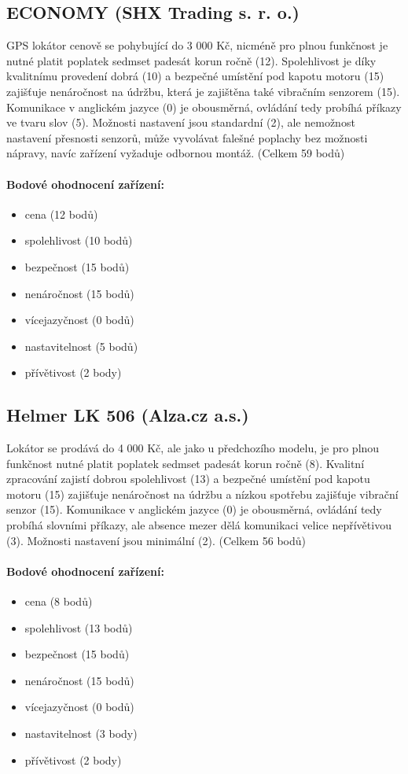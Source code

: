 \documentclass[FM,MP]{tulthesis}  %
\begin{document}
\subsection{ECONOMY (SHX Trading s. r. o.)}
GPS lokátor cenově se pohybující do 3 000 Kč, nicméně pro plnou funkčnost je nutné platit poplatek sedmset padesát korun ročně (12). Spolehlivost je díky kvalitnímu provedení dobrá (10) a bezpečné umístění pod kapotu motoru (15) zajišťuje nenáročnost na údržbu, která je zajištěna také vibračním senzorem (15). Komunikace v anglickém jazyce (0) je obousměrná, ovládání tedy probíhá příkazy ve tvaru slov (5). Možnosti nastavení jsou standardní (2), ale nemožnost nastavení přesnosti senzorů, může vyvolávat falešné poplachy bez možnosti nápravy, navíc zařízení vyžaduje odbornou montáž. (Celkem 59 bodů)

\paragraph{Bodové ohodnocení zařízení:}
\begin{itemize}
\item cena (12 bodů)
\item spolehlivost (10 bodů)
\item bezpečnost (15 bodů)
\item nenáročnost (15 bodů)
\item vícejazyčnost (0 bodů)
\item nastavitelnost (5 bodů)
\item přívětivost (2 body)
\end{itemize}

\subsection{Helmer LK 506 (Alza.cz a.s.)}
Lokátor se prodává do 4 000 Kč, ale jako u předchozího modelu, je pro plnou funkčnost nutné platit poplatek sedmset padesát korun ročně (8). Kvalitní zpracování zajistí dobrou spolehlivost (13) a bezpečné umístění pod kapotu motoru (15) zajišťuje nenáročnost na údržbu a nízkou spotřebu zajišťuje vibrační senzor (15). Komunikace v anglickém jazyce (0) je obousměrná, ovládání tedy probíhá slovními příkazy, ale absence mezer dělá komunikaci velice nepřívětivou (3). Možnosti nastavení jsou minimální (2). (Celkem 56 bodů)

\paragraph{Bodové ohodnocení zařízení:}
\begin{itemize}
\item cena (8 bodů)
\item spolehlivost (13 bodů)
\item bezpečnost (15 bodů)
\item nenáročnost (15 bodů)
\item vícejazyčnost (0 bodů)
\item nastavitelnost (3 body)
\item přívětivost (2 body)
\end{itemize}
\end{document}
